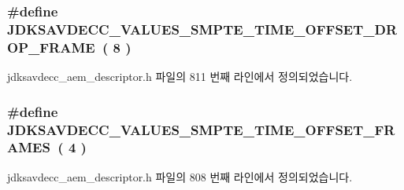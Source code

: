 \subsubsection[{\texorpdfstring{J\+D\+K\+S\+A\+V\+D\+E\+C\+C\+\_\+\+V\+A\+L\+U\+E\+S\+\_\+\+S\+M\+P\+T\+E\+\_\+\+T\+I\+M\+E\+\_\+\+O\+F\+F\+S\+E\+T\+\_\+\+D\+R\+O\+P\+\_\+\+F\+R\+A\+ME}{JDKSAVDECC_VALUES_SMPTE_TIME_OFFSET_DROP_FRAME}}]{\setlength{\rightskip}{0pt plus 5cm}\#define J\+D\+K\+S\+A\+V\+D\+E\+C\+C\+\_\+\+V\+A\+L\+U\+E\+S\+\_\+\+S\+M\+P\+T\+E\+\_\+\+T\+I\+M\+E\+\_\+\+O\+F\+F\+S\+E\+T\+\_\+\+D\+R\+O\+P\+\_\+\+F\+R\+A\+ME~( 8 )}\hypertarget{group__values__smpte__time_ga8e6db5bb04419768dd3e02d7b5ff0f8c}{}\label{group__values__smpte__time_ga8e6db5bb04419768dd3e02d7b5ff0f8c}


jdksavdecc\+\_\+aem\+\_\+descriptor.\+h 파일의 811 번째 라인에서 정의되었습니다.

\subsubsection[{\texorpdfstring{J\+D\+K\+S\+A\+V\+D\+E\+C\+C\+\_\+\+V\+A\+L\+U\+E\+S\+\_\+\+S\+M\+P\+T\+E\+\_\+\+T\+I\+M\+E\+\_\+\+O\+F\+F\+S\+E\+T\+\_\+\+F\+R\+A\+M\+ES}{JDKSAVDECC_VALUES_SMPTE_TIME_OFFSET_FRAMES}}]{\setlength{\rightskip}{0pt plus 5cm}\#define J\+D\+K\+S\+A\+V\+D\+E\+C\+C\+\_\+\+V\+A\+L\+U\+E\+S\+\_\+\+S\+M\+P\+T\+E\+\_\+\+T\+I\+M\+E\+\_\+\+O\+F\+F\+S\+E\+T\+\_\+\+F\+R\+A\+M\+ES~( 4 )}\hypertarget{group__values__smpte__time_gafee3d52eff70d86e6c7dbf0c10235556}{}\label{group__values__smpte__time_gafee3d52eff70d86e6c7dbf0c10235556}


jdksavdecc\+\_\+aem\+\_\+descriptor.\+h 파일의 808 번째 라인에서 정의되었습니다.

